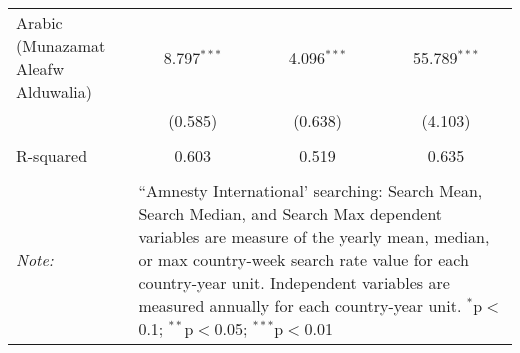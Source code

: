 \begin{table}[!htbp]
\begin{tabular}{@{\extracolsep{5pt}}lccc}
  Arabic (Munazamat Aleafw Alduwalia) & 8.797$^{***}$ & 4.096$^{***}$ & 55.789$^{***}$ \\ 
  & (0.585) & (0.638) & (4.103) \\ 
 \hline \\[-1.8ex] 
R-squared  & 0.603 & 0.519 & 0.635 \\ 
\hline 
\hline \\[-1.8ex] 
\textit{Note:}  & \multicolumn{3}{l}{\parbox[t]{8cm}{``Amnesty International' searching: Search Mean, Search Median, and Search Max dependent variables are measure of the yearly mean, median, or max country-week search rate value for each country-year unit. Independent variables are measured annually for each country-year unit. $^{*}$p$<$0.1; $^{**}$p$<$0.05; $^{***}$p$<$0.01}} \\ 
\end{tabular} 
\end{table} 
